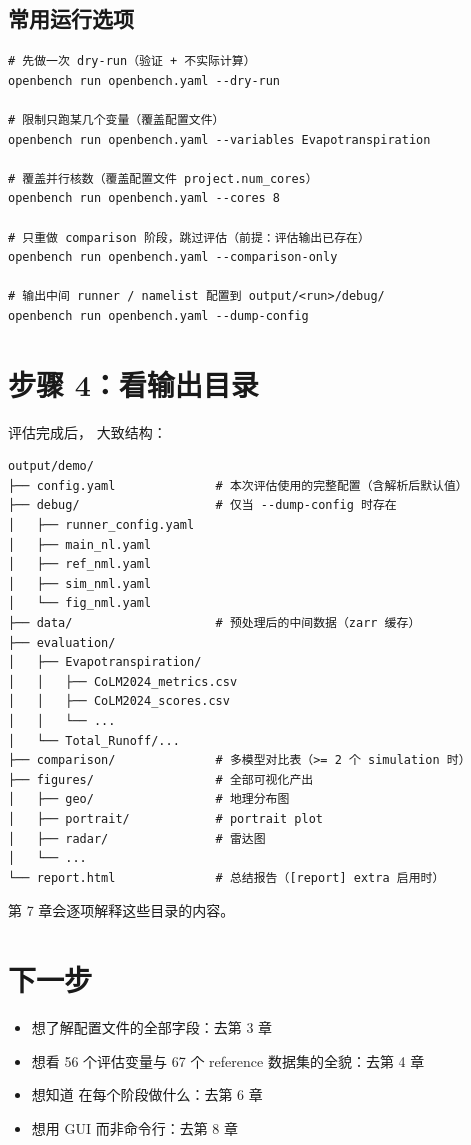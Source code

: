 \subsection{常用运行选项}

\begin{verbatim}
# 先做一次 dry-run（验证 + 不实际计算）
openbench run openbench.yaml --dry-run

# 限制只跑某几个变量（覆盖配置文件）
openbench run openbench.yaml --variables Evapotranspiration

# 覆盖并行核数（覆盖配置文件 project.num_cores）
openbench run openbench.yaml --cores 8

# 只重做 comparison 阶段，跳过评估（前提：评估输出已存在）
openbench run openbench.yaml --comparison-only

# 输出中间 runner / namelist 配置到 output/<run>/debug/
openbench run openbench.yaml --dump-config
\end{verbatim}


\section{步骤 4：看输出目录}

评估完成后， 大致结构：

\begin{verbatim}
output/demo/
├── config.yaml              # 本次评估使用的完整配置（含解析后默认值）
├── debug/                   # 仅当 --dump-config 时存在
│   ├── runner_config.yaml
│   ├── main_nl.yaml
│   ├── ref_nml.yaml
│   ├── sim_nml.yaml
│   └── fig_nml.yaml
├── data/                    # 预处理后的中间数据（zarr 缓存）
├── evaluation/
│   ├── Evapotranspiration/
│   │   ├── CoLM2024_metrics.csv
│   │   ├── CoLM2024_scores.csv
│   │   └── ...
│   └── Total_Runoff/...
├── comparison/              # 多模型对比表（>= 2 个 simulation 时）
├── figures/                 # 全部可视化产出
│   ├── geo/                 # 地理分布图
│   ├── portrait/            # portrait plot
│   ├── radar/               # 雷达图
│   └── ...
└── report.html              # 总结报告（[report] extra 启用时）
\end{verbatim}

第 7 章会逐项解释这些目录的内容。

\section{下一步}

\begin{itemize}
  \item 想了解配置文件的全部字段：去第 3 章
  \item 想看 56 个评估变量与 67 个 reference 数据集的全貌：去第 4 章
  \item 想知道 \openbench{} 在每个阶段做什么：去第 6 章
  \item 想用 GUI 而非命令行：去第 8 章
\end{itemize}
